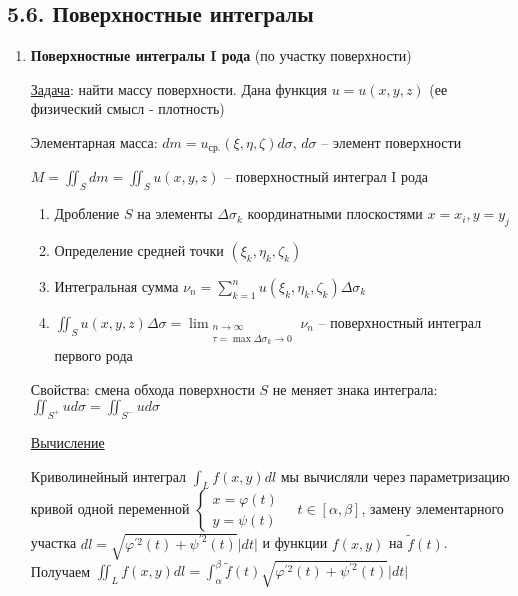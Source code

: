\documentclass[12pt]{article}
\begin{document}
    \subsection{5.6. Поверхностные интегралы}

    \hypertarget{surfaceintegraloffirstkind}{}

    \begin{enumerate}[label*=\textbf{\arabic** }]
    \item \textbf{Поверхностные интегралы I рода} (по участку поверхности)

    \underline{Задача}: найти массу поверхности. Дана функция $u = u(x, y, z)$ (ее физический смысл - плотность)

    Элементарная масса: $dm = u_{\text{ср.}}(\xi, \eta, \zeta) d\sigma$, $d\sigma$ -- элемент поверхности

    $M = \iint_S dm = \iint_S u(x, y, z)$ -- поверхностный интеграл I рода

    \begin{enumerate}
        \item Дробление $S$ на элементы $\Delta \sigma_k$ координатными плоскостями $x = x_i, y = y_j$

        \item Определение средней точки $(\xi_k, \eta_k, \zeta_k)$

        \item Интегральная сумма $\nu_n = \sum_{k = 1}^{n} u(\xi_k, \eta_k, \zeta_k) \Delta \sigma_k$

        \item \Defs $\iint_S u(x, y, z) \Delta \sigma = \lim_{\substack{n \to \infty \\ \tau = \max \Delta \sigma_k \to 0}} \nu_n$ -- поверхностный интеграл первого рода
    \end{enumerate}

    \hypertarget{surfaceintegraloffirstkindproperties}{}

    Свойства: смена обхода поверхности $S$ не меняет знака интеграла: $\iint_{S^+} u d\sigma = \iint_{S^-} u d\sigma$

    \mediumvspace


    \underline{Вычисление}

    \Mems Криволинейный интеграл $\int_L f(x, y) dl$ мы вычисляли через параметризацию кривой одной переменной $\begin{cases}x = \varphi(t) \\ y = \psi(t)\end{cases} \quad t \in [\alpha, \beta]$, замену элементарного участка
    $dl = \sqrt{\varphi^{\prime 2}(t) + \psi^{\prime 2}(t)} |dt|$ и функции $f(x, y)$ на $\tilde{f}(t)$. Получаем 
    $\iint_L f(x, y)dl = \int_\alpha^\beta \tilde{f}(t) \sqrt{\varphi^{\prime 2}(t) + \psi^{\prime 2}(t)} |dt|$
    

\end{enumerate}
\end{document}

